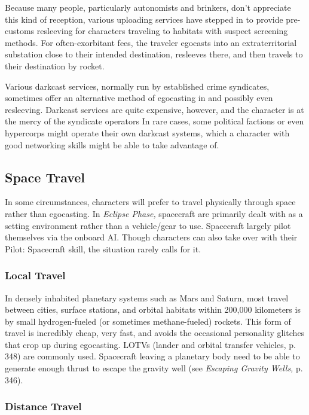 Because many people, particularly autonomists and 
brinkers, don't appreciate this kind of reception, various
uploading services have stepped in to provide pre-customs
resleeving for characters traveling to habitats
with suspect screening methods. For often-exorbitant 
fees, the traveler egocasts into an extraterritorial substation
close to their intended destination, resleeves
there, and then travels to their destination by rocket.

Various darkcast services, normally run by established
crime syndicates, sometimes offer an alternative
method of egocasting in and possibly even resleeving. 
Darkcast services are quite expensive, however, and 
the character is at the mercy of the syndicate operators
In rare cases, some political factions or even hypercorps
might operate their own darkcast systems,
which a character with good networking skills might 
be able to take advantage of.

\subsection{Space Travel}

In some circumstances, characters will prefer to travel 
physically through space rather than egocasting. In 
\textit{Eclipse Phase,} spacecraft are primarily dealt with as a 
setting environment rather than a vehicle/gear to use. 
Spacecraft largely pilot themselves via the onboard AI. 
Though characters can also take over with their Pilot: 
Spacecraft skill, the situation rarely calls for it.

\subsubsection{Local Travel}

In densely inhabited planetary systems such as Mars 
and Saturn, most travel between cities, surface stations, 
and orbital habitats within 200,000 kilometers is by 
small hydrogen-fueled (or sometimes methane-fueled) 
rockets. This form of travel is incredibly cheap, very 
fast, and avoids the occasional personality glitches 
that crop up during egocasting. LOTVs (lander and 
orbital transfer vehicles, p. 348) are commonly used. 
Spacecraft leaving a planetary body need to be able to 
generate enough thrust to escape the gravity well (see 
\textit{Escaping Gravity Wells,} p. 346).

\subsubsection{Distance Travel}

